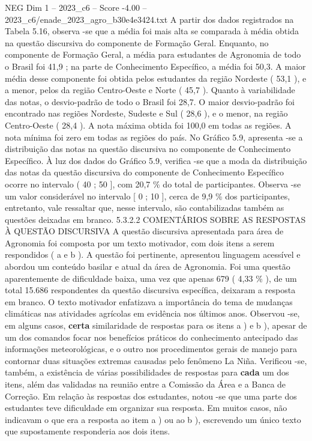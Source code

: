 \begin{textsample}{NEG Dim 1 – 2023\_c6 – Score -4.00 – 2023\_c6/enade\_2023\_agro\_b30e4e3424.txt}
A partir dos dados registrados na Tabela 5.16, observa -se que a média foi mais alta se comparada à média obtida na questão discursiva do componente de Formação Geral.
Enquanto, no componente de Formação Geral, a média para estudantes de Agronomia de todo o Brasil foi 41,9 ; na parte de Conhecimento Específico, a média foi 50,3.
A maior média desse componente foi obtida pelos estudantes da região Nordeste ( 53,1 ), e a menor, pelos da região Centro-Oeste e Norte ( 45,7 ).
Quanto à variabilidade das notas, o desvio-padrão de todo o Brasil foi 28,7.
O maior desvio-padrão foi encontrado nas regiões Nordeste, Sudeste e Sul ( 28,6 ), e o menor, na região Centro-Oeste ( 28,4 ).
A nota máxima obtida foi 100,0 em todas as regiões.
A nota mínima foi zero em todas as regiões do país.
No Gráfico 5.9, apresenta -se a distribuição das notas na questão discursiva no componente de Conhecimento Específico.
À luz dos dados do Gráfico 5.9, verifica -se que a moda da distribuição das notas da questão discursiva do componente de Conhecimento Específico ocorre no intervalo ( 40 ; 50 ], com 20,7 \% do total de participantes.
Observa -se um valor considerável no intervalo [ 0 ; 10 ], cerca de 9,9 \% dos participantes, entretanto, vale ressaltar que, nesse intervalo, são contabilizadas também as questões deixadas em branco. 5.3.2.2 COMENTÁRIOS SOBRE AS RESPOSTAS À QUESTÃO DISCURSIVA A questão discursiva apresentada para área de Agronomia foi composta por um texto motivador, com dois itens a serem respondidos ( a e b ).
A questão foi pertinente, apresentou linguagem acessível e abordou um conteúdo basilar e atual da área de Agronomia.
Foi uma questão aparentemente de dificuldade baixa, uma vez que apenas 679 ( 4,33 \% ), de um total 15.686 respondentes da questão discursiva específica, deixaram a resposta em branco.
O texto motivador enfatizava a importância do tema de mudanças climáticas nas atividades agrícolas em evidência nos últimos anos.
Observou -se, em alguns casos, \textbf{certa} similaridade de respostas para os itens a ) e b ), apesar de um dos comandos focar nos benefícios práticos do conhecimento antecipado das informações meteorológicas, e o outro nos procedimentos gerais de manejo para contornar duas situações extremas causadas pelo fenômeno La Niña.
Verificou -se, também, a existência de várias possibilidades de respostas para \textbf{cada} um dos itens, além das validadas na reunião entre a Comissão da Área e a Banca de Correção.
Em relação às respostas dos estudantes, notou -se que uma parte dos estudantes teve dificuldade em organizar sua resposta.
Em muitos casos, não indicavam o que era a resposta ao item a ) ou ao b ), escrevendo um único texto que supostamente responderia aos dois itens.

\end{textsample}
